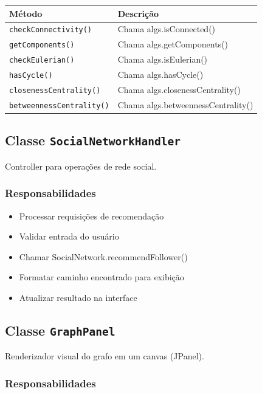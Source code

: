 \documentclass[12pt,a4paper]{article}
\begin{document}
\begin{table}[h]
\centering
\begin{tabular}{|l|l|}
\hline
\textbf{Método} & \textbf{Descrição} \\
\hline
\texttt{checkConnectivity()} & Chama algs.isConnected() \\
\hline
\texttt{getComponents()} & Chama algs.getComponents() \\
\hline
\texttt{checkEulerian()} & Chama algs.isEulerian() \\
\hline
\texttt{hasCycle()} & Chama algs.hasCycle() \\
\hline
\texttt{closenessCentrality()} & Chama algs.closenessCentrality() \\
\hline
\texttt{betweennessCentrality()} & Chama algs.betweennessCentrality() \\
\hline
\end{tabular}
\end{table}

\subsection{Classe \texttt{SocialNetworkHandler}}

Controller para operações de rede social.

\subsubsection{Responsabilidades}

\begin{itemize}
    \item Processar requisições de recomendação
    \item Validar entrada do usuário
    \item Chamar SocialNetwork.recommendFollower()
    \item Formatar caminho encontrado para exibição
    \item Atualizar resultado na interface
\end{itemize}

\subsection{Classe \texttt{GraphPanel}}

Renderizador visual do grafo em um canvas (JPanel).

\subsubsection{Responsabilidades}
\end{document}

